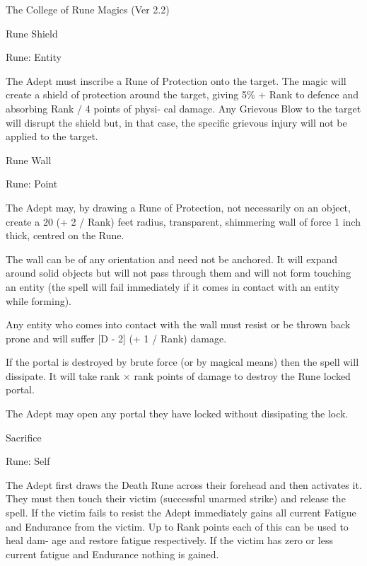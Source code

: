 \begin{Chapter}{The College of Rune Magics (Ver 2.2)}
\begin{spell}[S-10]{Rune Shield }

Rune: Entity 
\begin{effects}
The Adept must inscribe a Rune of Protection onto the target.  The
magic will create a shield of protection around the target, giving 5\%
+ Rank to defence and absorbing Rank / 4 points of physi- cal damage.
Any Grievous Blow to the target will disrupt the shield but, in that
case, the specific grievous injury will not be applied to the target.
\end{effects}
\end{spell}

\begin{spell}[S-11]{Rune Wall }

Rune: Point 
\begin{effects}
The Adept may, by drawing a Rune of Protection, not necessarily on an
object, create a 20 (+ 2 / Rank) feet radius, transparent, shimmering
wall of force 1 inch thick, centred on the Rune.

The wall can be of any orientation and need not be anchored.  It will
expand around solid objects but will not pass through them and will
not form touching an entity (the spell will fail immediately if it
comes in contact with an entity while forming).

Any entity who comes into contact with the wall must resist or be
thrown back prone and will suffer [D - 2] (+ 1 / Rank) damage.

If the portal is destroyed by brute force (or by magical means) then
the spell will dissipate. It will take rank × rank points of damage to
destroy the Rune locked portal.

The Adept may open any portal they have locked without dissipating the
lock.
\end{effects}
\end{spell}

\begin{spell}[S-12]{Sacrifice }

Rune: Self 
\begin{effects}
The Adept first draws the Death Rune across their forehead and then
activates it.  They must then touch their victim (successful unarmed
strike) and release the spell.  If the victim fails to resist the
Adept immediately gains all current Fatigue and Endurance from the
victim.  Up to Rank points each of this can be used to heal dam- age
and restore fatigue respectively.  If the victim has zero or less
current fatigue and Endurance nothing is gained.


\end{effects}
\end{spell}
\end{Chapter}
